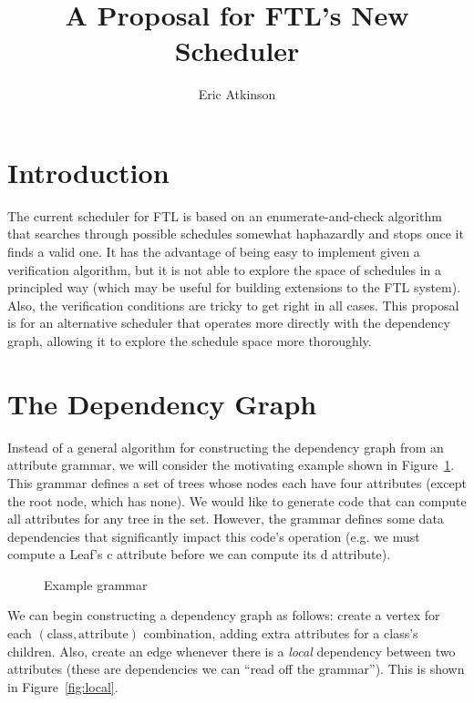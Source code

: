 \documentclass[10pt]{article}
\begin{document}
    \title{A Proposal for FTL's New Scheduler}
    \author{Eric Atkinson}
    \maketitle

    \section{Introduction}
    The current scheduler for FTL is based on an enumerate-and-check algorithm that searches through possible schedules somewhat haphazardly and stops once it finds a valid one. It has the advantage of being easy to implement given a verification algorithm, but it is not able to explore the space of schedules in a principled way (which may be useful for building extensions to the FTL system). Also, the verification conditions are tricky to get right in all cases. This
    proposal is for an alternative scheduler that operates more directly with the dependency graph, allowing it to explore the schedule space more thoroughly.

    \section{The Dependency Graph}
    Instead of a general algorithm for constructing the dependency graph from an attribute grammar, we will consider the motivating example shown in Figure~\ref{fig:grammar}. This grammar defines a set of trees whose nodes each have four attributes (except the root node, which has none). We would like to generate code that can compute all attributes for any tree in the set. However, the grammar defines some data dependencies that significantly impact this code's operation (e.g. we must
    compute a Leaf's c attribute before we can compute its d attribute).

    \begin{figure}[h]
        
        \caption{Example grammar}
        \label{fig:grammar}
    \end{figure}

    We can begin constructing a dependency graph as follows: create a vertex for each $ (\textrm{class},\textrm{attribute}) $ combination, adding extra attributes for a class's children. Also, create an edge whenever there is a \emph{local} dependency between two attributes (these are dependencies we can ``read off the grammar''). This is shown in Figure~\ref{fig:local}.
\end{document}

